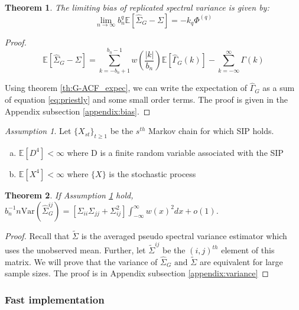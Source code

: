 \documentclass[11pt]{article}
\newcommand{\E}{\mathbb{E}}
\newcommand{\Var}{\text{Var}}
\newtheorem{theorem}{Theorem}
\theoremstyle{remark}
\newtheorem{ass}{Assumption}
\begin{document}
\begin{theorem}\label{th:G-SVE_bias}
The limiting bias of replicated spectral variance is given by:
\[
 \lim_{n \to \infty}b_n^q\mathbb{E} \left[\hat{\Sigma}_{G} - \Sigma \right] = -k_q\Phi^{(q)}
 \]
\end{theorem}

\begin{proof}
\[
\mathbb{E} \left[\hat{\Sigma}_{G} - \Sigma \right] = \sum_{k=-b_n+1}^{b_n-1} w\left(\dfrac{|k|}{b_n}\right)\mathbb{E} \left[\hat{\Gamma}_{G}(k) \right] - \sum_{k=-\infty}^{\infty}\Gamma(k)
\]

Using theorem \ref{th:G-ACF_expec}, we can write the expectation of $\hat{\Gamma}_{G}$ as  a sum of equation \ref{eq:priestly} and some small order terms.
The proof is given in the Appendix subsection \ref{appendix:bias}.
\end{proof}


\begin{ass} \label{ass:variance_cal}
Let $\{X_{st}\}_{t \geq 1}$ be the $s^{th}$ Markov chain for which SIP holds. 
\begin{enumerate}[a.]
    \item $\E[D^4] < \infty$ where D is a finite random variable associated with the SIP
    \item $\E[X^4] < \infty$ where $\{X\}$ is the stochastic process
\end{enumerate}
\end{ass}


\begin{theorem} \label{th:G-SVE_variance}
 If Assumption \ref{ass:variance_cal} hold, $b_n^{-1}{n}\Var \left(\hat{\Sigma}_{G}^{ij} \right) = [\Sigma_{ii}\Sigma_{jj} + \Sigma_{ij}^2]\int_{-\infty}^{\infty}w(x)^2dx  + o(1)$.
\end{theorem}

\begin{proof}
Recall that $\tilde{\Sigma}$ is the averaged pseudo spectral variance estimator which uses the unobserved mean. Further, let $\tilde{\Sigma}^{ij}$ be the $(i,j)^{th}$ element of this matrix. We will prove that the variance of $\hat{\Sigma}_{G} \textrm{ and } \tilde{\Sigma}$ are equivalent for large sample sizes. The proof is in Appendix subsection \ref{appendix:variance}
\end{proof}

\subsubsection{Fast implementation} %
\label{ssub:fast_implementation}
\end{document}
